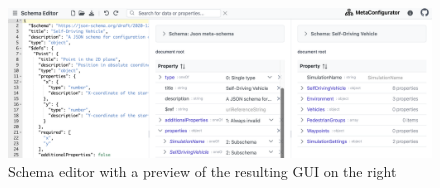 \begin{figure}
    \includegraphics[width=\textwidth]{figures/panels_for_modified_schema_editor_config}
    \caption{Schema editor with a preview of the resulting GUI on the right}
    \label{fig:panels_for_modified_schema_editor_config}
\end{figure}



